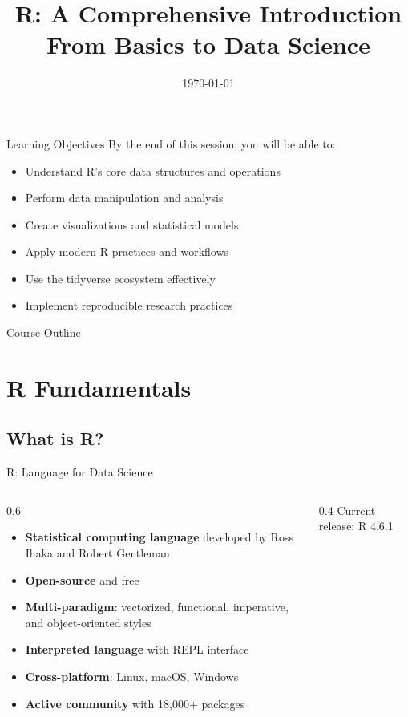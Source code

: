 \documentclass[aspectratio=169]{beamer}
\title[R: A Comprehensive Introduction]{R: A Comprehensive Introduction\\From Basics to Data Science}
\date{\today}
\begin{document}
\begin{frame}
  \titlepage
\end{frame}

\begin{frame}{Learning Objectives}
  By the end of this session, you will be able to:
  \begin{itemize}
    \item Understand R's core data structures and operations
    \item Perform data manipulation and analysis
    \item Create visualizations and statistical models
    \item Apply modern R practices and workflows
    \item Use the tidyverse ecosystem effectively
    \item Implement reproducible research practices
  \end{itemize}
\end{frame}

\begin{frame}{Course Outline}
  \tableofcontents[hideallsubsections]
\end{frame}

\section{R Fundamentals}

\subsection{What is R?}

\begin{frame}{R: Language for Data Science}
  \begin{columns}
    \begin{column}{0.6\textwidth}
      \begin{itemize}
        \item \textbf{Statistical computing language} developed by Ross Ihaka and Robert Gentleman
        \item \textbf{Open-source} and free
        \item \textbf{Multi-paradigm}: vectorized, functional, imperative, and object-oriented styles
        \item \textbf{Interpreted language} with REPL interface
        \item \textbf{Cross-platform}: Linux, macOS, Windows
        \item \textbf{Active community} with 18,000+ packages
      \end{itemize}
    \end{column}
    \begin{column}{0.4\textwidth}
      \centering
      \vspace{1em}
      \small Current release: R 4.6.1
    \end{column}
  \end{columns}
\end{frame}
\end{document}
